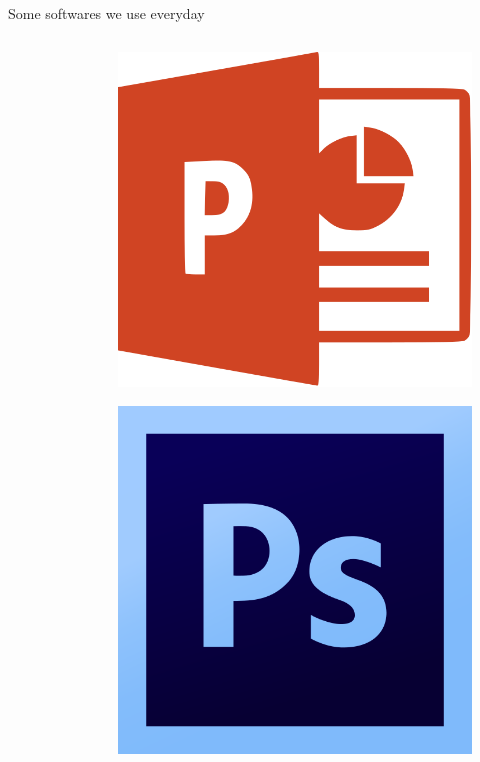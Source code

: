 \documentclass[10pt]{beamer}
\begin{document}
\begin{frame}{Some softwares we use everyday}
\begin{columns}
\begin{column}{0.33\textwidth}
\begin{figure}
                \end{figure}
            \end{column}
            \begin{column}{0.33\textwidth}
                \begin{figure}
                    \centering
                    \includegraphics[width=1\textwidth]{images/powerpoint}
                \end{figure}
                \begin{figure}
                    \centering
                    \includegraphics[width=1\textwidth]{images/photoshop}
                \end{figure}
            \end{column}
        \end{columns}
    \end{frame}
\end{document}
